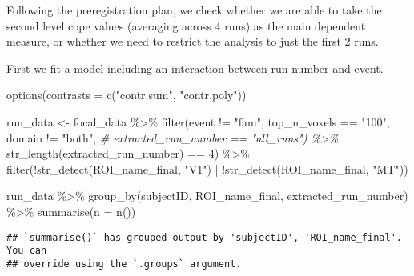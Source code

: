 \documentclass[
]{article}
\newenvironment{Shaded}{\begin{snugshade}}{\end{snugshade}}
\newcommand{\AttributeTok}[1]{\textcolor[rgb]{0.77,0.63,0.00}{#1}}
\newcommand{\CommentTok}[1]{\textcolor[rgb]{0.56,0.35,0.01}{\textit{#1}}}
\newcommand{\DecValTok}[1]{\textcolor[rgb]{0.00,0.00,0.81}{#1}}
\newcommand{\FunctionTok}[1]{\textcolor[rgb]{0.00,0.00,0.00}{#1}}
\newcommand{\NormalTok}[1]{#1}
\newcommand{\OtherTok}[1]{\textcolor[rgb]{0.56,0.35,0.01}{#1}}
\newcommand{\SpecialCharTok}[1]{\textcolor[rgb]{0.00,0.00,0.00}{#1}}
\newcommand{\StringTok}[1]{\textcolor[rgb]{0.31,0.60,0.02}{#1}}
\begin{document}
Following the preregistration plan, we check whether we are able to take
the second level cope values (averaging across 4 runs) as the main
dependent measure, or whether we need to restrict the analysis to just
the first 2 runs.

First we fit a model including an interaction between run number and
event.

\begin{Shaded}
\begin{Highlighting}[]
\FunctionTok{options}\NormalTok{(}\AttributeTok{contrasts =} \FunctionTok{c}\NormalTok{(}\StringTok{"contr.sum"}\NormalTok{, }\StringTok{"contr.poly"}\NormalTok{))}

\NormalTok{run\_data }\OtherTok{\textless{}{-}}\NormalTok{ focal\_data }\SpecialCharTok{\%\textgreater{}\%}
  \FunctionTok{filter}\NormalTok{(event }\SpecialCharTok{!=} \StringTok{"fam"}\NormalTok{,}
\NormalTok{         top\_n\_voxels }\SpecialCharTok{==} \StringTok{"100"}\NormalTok{,}
\NormalTok{         domain }\SpecialCharTok{!=} \StringTok{"both"}\NormalTok{,}
         \CommentTok{\# extracted\_run\_number == "all\_runs") \%\textgreater{}\%}
         \FunctionTok{str\_length}\NormalTok{(extracted\_run\_number) }\SpecialCharTok{==} \DecValTok{4}\NormalTok{) }\SpecialCharTok{\%\textgreater{}\%}
  \FunctionTok{filter}\NormalTok{(}\SpecialCharTok{!}\FunctionTok{str\_detect}\NormalTok{(ROI\_name\_final, }\StringTok{"V1"}\NormalTok{) }\SpecialCharTok{|}
           \SpecialCharTok{!}\FunctionTok{str\_detect}\NormalTok{(ROI\_name\_final, }\StringTok{"MT"}\NormalTok{))}

\NormalTok{run\_data }\SpecialCharTok{\%\textgreater{}\%}
  \FunctionTok{group\_by}\NormalTok{(subjectID, ROI\_name\_final, extracted\_run\_number) }\SpecialCharTok{\%\textgreater{}\%}
  \FunctionTok{summarise}\NormalTok{(}\AttributeTok{n =} \FunctionTok{n}\NormalTok{())}
\end{Highlighting}
\end{Shaded}

\begin{verbatim}
## `summarise()` has grouped output by 'subjectID', 'ROI_name_final'. You can
## override using the `.groups` argument.
\end{verbatim}
\end{document}
